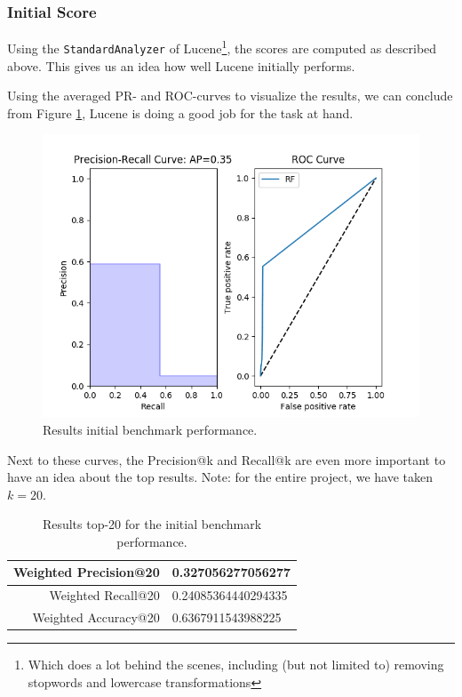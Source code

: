 \documentclass[11pt]{article}
\begin{document}
\subsubsection{Initial Score}
Using the \texttt{StandardAnalyzer} of Lucene\footnote{Which does a lot behind the scenes, including (but not limited to) removing stopwords and lowercase transformations}, the scores are computed as described above. This gives us an idea how well Lucene initially performs.

Using the averaged PR- and ROC-curves to visualize the results, we can conclude from Figure \ref{fig:initBP}, Lucene is doing a good job for the task at hand.

\begin{figure}[htp]
    \centering
    \includegraphics[width=\textwidth]{images/2ndTerm/Standard}
    \caption{Results initial benchmark performance.}
    \label{fig:initBP}
\end{figure}

Next to these curves, the \textsf{Precision@k} and \textsf{Recall@k} are even more important to have an idea about the top results. Note: for the entire project, we have taken $k=20$.

\begin{table}[htp]
	\centering
	\begin{tabular}{|r|l|}
		\hline
		Weighted \textsf{Precision@20} & 0.327056277056277 \\ \hline
		Weighted \textsf{Recall@20} & 0.24085364440294335 \\ \hline
		Weighted \textsf{Accuracy@20} & 0.6367911543988225 \\ \hline
	\end{tabular}
	\caption{Results top-20 for the initial benchmark performance.}
	\label{tbl:atk-init}
\end{table}
\end{document}
